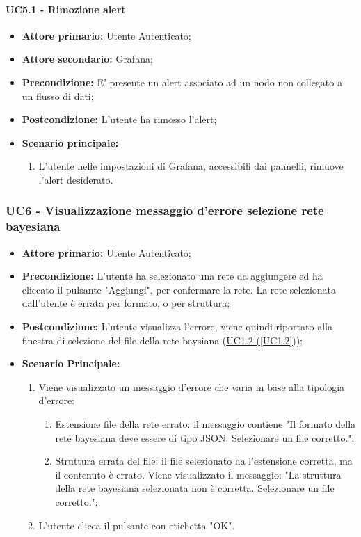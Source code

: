 \paragraph{UC5.1 - Rimozione alert}\label{UC5.1}
\begin{itemize}
	\item \textbf{Attore primario:} Utente Autenticato;
	\item \textbf{Attore secondario:} Grafana;
	\item \textbf{Precondizione:} E' presente un alert associato ad un nodo non collegato a un flusso di dati;
	\item \textbf{Postcondizione:} L'utente ha rimosso l'alert;
	\item \textbf{Scenario principale:}
	\begin{enumerate}
		\item L'utente nelle impostazioni di Grafana, accessibili dai pannelli, rimuove l'alert desiderato.
	\end{enumerate}
\end{itemize}

\pagebreak

\subsubsection{UC6 - Visualizzazione messaggio d'errore selezione  rete bayesiana}\label{UC6}
\begin{itemize}
\item \textbf{Attore primario:} Utente Autenticato;
\item \textbf{Precondizione:} L'utente ha selezionato una rete da aggiungere ed ha cliccato il pulsante "Aggiungi", per confermare la rete. La rete selezionata dall'utente è errata per formato, o per struttura;
\item \textbf{Postcondizione:} L'utente visualizza l'errore, viene quindi riportato alla finestra di selezione del file della rete baysiana (\hyperref[UC1.2]{UC1.2 (\ref*{UC1.2})});
\item \textbf{Scenario Principale:} 
	\begin{enumerate}
		\item Viene visualizzato un messaggio d'errore che varia in base alla tipologia d'errore:
			\begin{enumerate}
				\item Estensione file della rete errato: il messaggio contiene "Il formato della rete bayesiana deve essere di tipo JSON. Selezionare un file corretto.";
				\item Struttura errata del file: il file selezionato ha l'estensione corretta, ma il contenuto è errato. Viene visualizzato il messaggio: "La struttura della rete bayesiana selezionata non è corretta. Selezionare un file corretto.";
			\end{enumerate}
		\item L'utente clicca il pulsante con etichetta "OK".
	\end{enumerate}
\end{itemize}

